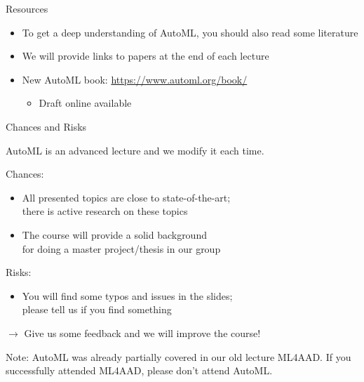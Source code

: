\begin{frame}[c]{Resources}

\begin{itemize}
  \item To get a deep understanding of AutoML, you should also read some literature 
  \item We will provide links to papers at the end of each lecture
  \item New AutoML book: \url{https://www.automl.org/book/}
  \begin{itemize}
    \item Draft online available
  \end{itemize}
\end{itemize}

\end{frame}
\begin{frame}[c]{Chances and Risks}

AutoML is an advanced lecture and we modify it each time.

\bigskip
\pause

Chances:
\begin{itemize}
  \item All presented topics are close to state-of-the-art;\\there is active research on these topics  
  \item The course will provide a solid background\\ for doing a master project/thesis in our group 
\end{itemize}

\medskip

Risks:
\begin{itemize}
  \item You will find some typos and issues in the slides;\\ please tell us if you find something
\end{itemize}

\medskip
\pause
$\to$ Give us some feedback and we will improve the course!

\medskip
\pause
Note: AutoML was already partially covered in our old lecture ML4AAD. 
If you successfully attended ML4AAD, please don't attend AutoML.

\end{frame}
